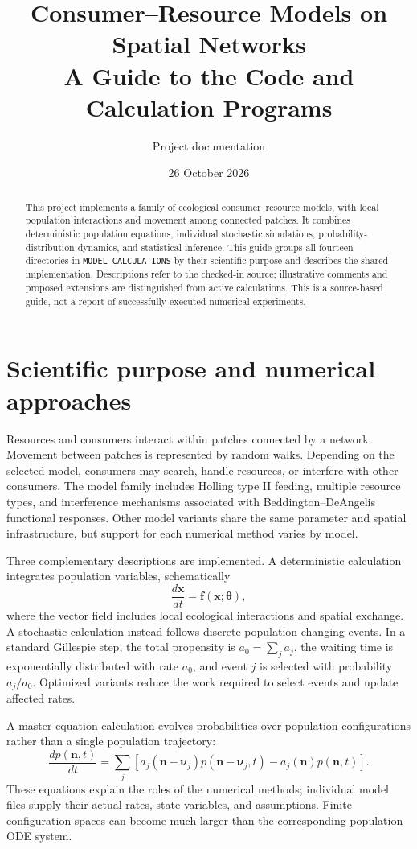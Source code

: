 \documentclass[11pt,a4paper]{article}
\title{Consumer--Resource Models on Spatial Networks\\A Guide to the Code and Calculation Programs}
\author{Project documentation}
\date{26 October 2026}
\DeclareRobustCommand{\code}[1]{\nolinkurl{#1}}
\begin{document}
\maketitle
\begin{abstract}
This project implements a family of ecological consumer--resource models, with local population interactions and movement among connected patches. It combines deterministic population equations, individual stochastic simulations, probability-distribution dynamics, and statistical inference. This guide groups all fourteen directories in \code{MODEL_CALCULATIONS} by their scientific purpose and describes the shared implementation. Descriptions refer to the checked-in source; illustrative comments and proposed extensions are distinguished from active calculations. This is a source-based guide, not a report of successfully executed numerical experiments.
\end{abstract}
\tableofcontents

\section{Scientific purpose and numerical approaches}
Resources and consumers interact within patches connected by a network. Movement between patches is represented by random walks. Depending on the selected model, consumers may search, handle resources, or interfere with other consumers. The model family includes Holling type II feeding, multiple resource types, and interference mechanisms associated with Beddington--DeAngelis functional responses. Other model variants share the same parameter and spatial infrastructure, but support for each numerical method varies by model.

Three complementary descriptions are implemented. A deterministic calculation integrates population variables, schematically
\begin{equation}
 \frac{d\boldsymbol{x}}{dt}=\boldsymbol{f}(\boldsymbol{x};\boldsymbol{\theta}),
\end{equation}
where the vector field includes local ecological interactions and spatial exchange. A stochastic calculation instead follows discrete population-changing events. In a standard Gillespie step, the total propensity is $a_0=\sum_j a_j$, the waiting time is exponentially distributed with rate $a_0$, and event $j$ is selected with probability $a_j/a_0$. Optimized variants reduce the work required to select events and update affected rates.

A master-equation calculation evolves probabilities over population configurations rather than a single population trajectory:
\begin{equation}
 \frac{dp(\boldsymbol{n},t)}{dt}=
 \sum_j\left[a_j(\boldsymbol{n}-\boldsymbol{\nu}_j)
 p(\boldsymbol{n}-\boldsymbol{\nu}_j,t)
 -a_j(\boldsymbol{n})p(\boldsymbol{n},t)\right].
\end{equation}
These equations explain the roles of the numerical methods; individual model files supply their actual rates, state variables, and assumptions. Finite configuration spaces can become much larger than the corresponding population ODE system.
\end{document}
